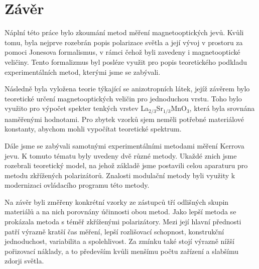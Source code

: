 \chapter*{Závěr}

Náplní této práce bylo zkoumání metod měření magnetooptických jevů. Kvůli tomu, byla nejprve rozebrán popis polarizace světla 
a její vývoj v prostoru za pomoci Jonesova formalismus, v rámci čehož byli zavedeny i magnetooptické veličiny. Tento formalizmus 
byl posléze využit pro popis teoretického podkladu experimentálních metod, kterými jsme se zabývali.

Následně byla vyložena teorie týkající se anizotropních látek, jejíž závěrem bylo teoretické určení magnetooptických veličin pro jednoduchou 
vrstu. Toho bylo využito pro výpočet spekter tenkých vrstev La$_{2/3}$Sr$_{1/3}$MnO$_3$, která byla srovnána naměřenými hodnotami. 
Pro zbytek vzorků sjem neměli potřebné materiálové konstanty, abychom mohli vypočítat teoretické spektrum.

Dále jsme se zabývali samotnými experimentálními metodami měření Kerrova jevu. K tomuto tématu byly uvedeny dvě různé metody. Ukaždé znich 
jsme rozebrali teoretický model, na jehož základě jsme postavili celou aparaturu pro metodu zkřížených polarizátorů. 
Znalosti modulační metody byli využity k modernizaci ovládacího programu této metody.

Na závěr byli změřeny konkrétní vzorky ze zástupců tří odlišných skupin materiálů a na nich porovnány účinnosti obou metod. Jako lepší metoda
se prokázala metoda s téměř zkříženými polarizátory. Mezi její hlavní přednosti patří výrazně kratší čas měření, lepší rozlišovací schopnost, 
konstrukční jednoduchost, variabilita a spolehlivost. Za zmínku také stojí výrazně nížší pořizovací náklady, a to především kvůli menšímu počtu 
zařízení a slabšímu zdorji světla.
